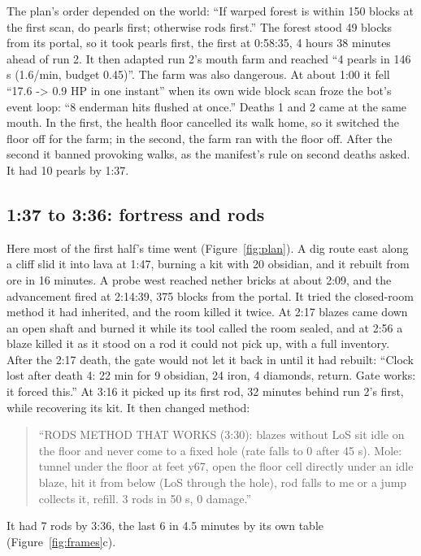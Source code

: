 \documentclass[11pt,a4paper]{article}
\begin{document}
The plan's order depended on the world: ``If warped forest is within 150 blocks at the first scan, do pearls first; otherwise rods first.'' The forest stood 49 blocks from its portal, so it took pearls first, the first at 0:58:35, 4 hours 38 minutes ahead of run 2. It then adapted run 2's mouth farm and reached ``4 pearls in 146 s (1.6/min, budget 0.45)''. The farm was also dangerous. At about 1:00 it fell ``17.6 -> 0.9 HP in one instant'' when its own wide block scan froze the bot's event loop: ``8 enderman hits flushed at once.'' Deaths 1 and 2 came at the same mouth. In the first, the health floor cancelled its walk home, so it switched the floor off for the farm; in the second, the farm ran with the floor off. After the second it banned provoking walks, as the manifest's rule on second deaths asked. It had 10 pearls by 1:37.

\subsection{1:37 to 3:36: fortress and rods}

Here most of the first half's time went (Figure~\ref{fig:plan}). A dig route east along a cliff slid it into lava at 1:47, burning a kit with 20 obsidian, and it rebuilt from ore in 16 minutes. A probe west reached nether bricks at about 2:09, and the advancement fired at 2:14:39, 375 blocks from the portal. It tried the closed-room method it had inherited, and the room killed it twice. At 2:17 blazes came down an open shaft and burned it while its tool called the room sealed, and at 2:56 a blaze killed it as it stood on a rod it could not pick up, with a full inventory. After the 2:17 death, the gate would not let it back in until it had rebuilt: ``Clock lost after death 4: 22 min for 9 obsidian, 24 iron, 4 diamonds, return. Gate works: it forced this.'' At 3:16 it picked up its first rod, 32 minutes behind run 2's first, while recovering its kit. It then changed method:

\begin{quote}
``RODS METHOD THAT WORKS (3:30): blazes without LoS sit idle on the floor and never come to a fixed hole (rate falls to 0 after 45 s). Mole: tunnel under the floor at feet y67, open the floor cell directly under an idle blaze, hit it from below (LoS through the hole), rod falls to me or a jump collects it, refill. 3 rods in 50 s, 0 damage.''
\end{quote}

It had 7 rods by 3:36, the last 6 in 4.5 minutes by its own table (Figure~\ref{fig:frames}c).
\end{document}
